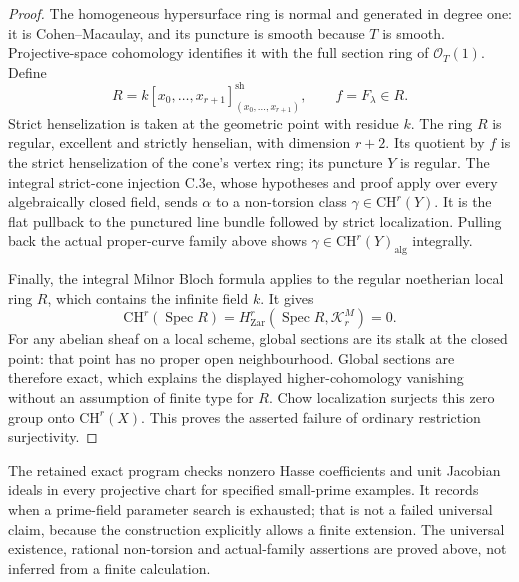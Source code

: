 \begin{proof}
The homogeneous hypersurface ring is normal and generated in degree
one: it is Cohen--Macaulay, and its puncture is smooth because $T$
is smooth. Projective-space cohomology identifies it with the full
section ring of $\mathcal O_T(1)$. Define
\[
 R=k[x_0,\ldots,x_{r+1}]_{(x_0,\ldots,x_{r+1})}^{\mathrm{sh}},
 \qquad f=F_\lambda\in R.
\]
Strict henselization is taken at the geometric point with residue $k$.
The ring $R$ is regular, excellent and strictly henselian, with
dimension $r+2$. Its quotient by $f$ is the strict henselization of
the cone's vertex ring; its puncture $Y$ is regular. The integral
strict-cone injection C.3e, whose hypotheses and proof apply over
every algebraically closed field, sends $\alpha$ to a non-torsion
class $\gamma\in\mathrm{CH}^r(Y)$. It is the flat pullback to the
punctured line bundle followed by strict localization. Pulling back
the actual proper-curve family above shows
$\gamma\in\mathrm{CH}^r(Y)_{\mathrm{alg}}$ integrally.

Finally, the integral Milnor Bloch formula
\citep[Theorem~7.5, author p.~22]{cyKerz2009Milnor} applies to the
regular noetherian local ring $R$, which contains the infinite field
$k$. It gives
\[
 \mathrm{CH}^r(\operatorname{Spec}R)
       =H^r_{\mathrm{Zar}}(\operatorname{Spec}R,\mathcal K^M_r)=0.
\]
For any abelian sheaf on a local scheme, global sections are its
stalk at the closed point: that point has no proper open
neighbourhood. Global sections are therefore exact, which explains
the displayed higher-cohomology vanishing without an assumption
of finite type for $R$. Chow localization surjects this zero group
onto $\mathrm{CH}^r(X)$. This proves the asserted failure of ordinary
restriction surjectivity.
\end{proof}

The retained exact program checks nonzero Hasse coefficients and unit
Jacobian ideals in every projective chart for specified small-prime
examples. It records when a prime-field parameter search is exhausted;
that is not a failed universal claim, because the construction explicitly
allows a finite extension. The universal existence, rational
non-torsion and actual-family assertions are proved above, not inferred
from a finite calculation.
